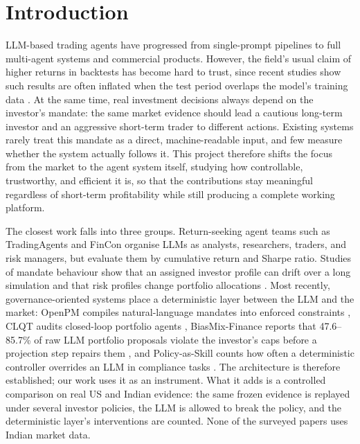 \section{Introduction}
LLM-based trading agents have progressed from single-prompt pipelines to full multi-agent systems and commercial products. However, the field's usual claim of higher returns in backtests has become hard to trust, since recent studies show such results are often inflated when the test period overlaps the model's training data \cite{gao2025lookahead,glasserman2024lookahead,alphaillusion}. At the same time, real investment decisions always depend on the investor's mandate: the same market evidence should lead a cautious long-term investor and an aggressive short-term trader to different actions. Existing systems rarely treat this mandate as a direct, machine-readable input, and few measure whether the system actually follows it. This project therefore shifts the focus from the market to the agent system itself, studying how controllable, trustworthy, and efficient it is, so that the contributions stay meaningful regardless of short-term profitability while still producing a complete working platform.

The closest work falls into three groups. Return-seeking agent teams such as TradingAgents \cite{tradingagents} and FinCon \cite{fincon} organise LLMs as analysts, researchers, traders, and risk managers, but evaluate them by cumulative return and Sharpe ratio. Studies of mandate behaviour show that an assigned investor profile can drift over a long simulation \cite{finpersona} and that risk profiles change portfolio allocations \cite{portbench}. Most recently, governance-oriented systems place a deterministic layer between the LLM and the market: OpenPM compiles natural-language mandates into enforced constraints \cite{openpm}, CLQT audits closed-loop portfolio agents \cite{clqt}, BiasMix-Finance reports that 47.6--85.7\% of raw LLM portfolio proposals violate the investor's caps before a projection step repairs them \cite{biasmix}, and Policy-as-Skill counts how often a deterministic controller overrides an LLM in compliance tasks \cite{policyasskill}. The architecture is therefore established; our work uses it as an instrument. What it adds is a controlled comparison on real US and Indian evidence: the same frozen evidence is replayed under several investor policies, the LLM is allowed to break the policy, and the deterministic layer's interventions are counted. None of the surveyed papers uses Indian market data.

